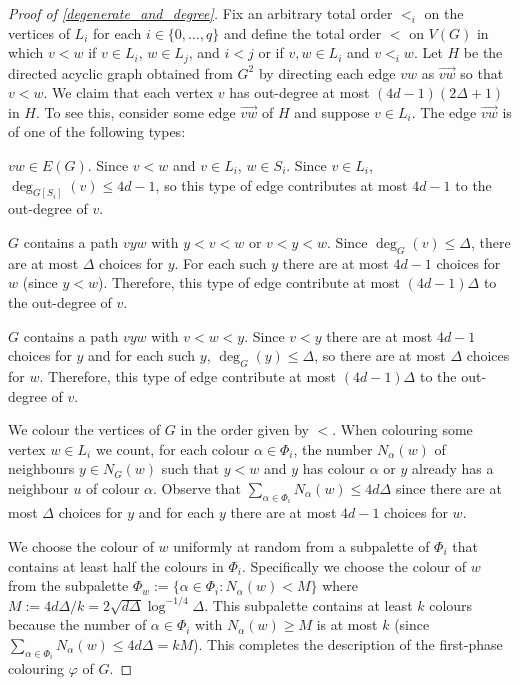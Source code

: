 \documentclass{patmorin}
\begin{document}
\begin{proof}[Proof of \cref{degenerate_and_degree}]
  Fix an arbitrary total order $<_i$ on the vertices of $L_i$ for each $i\in\{0,\ldots,q\}$ and define the total order $<$ on $V(G)$ in which $v <w$ if $v\in L_i$, $w\in L_j$, and $i<j$ or if $v,w\in L_i$ and $v<_iw$.  Let $H$ be the directed acyclic graph obtained from $G^2$ by directing each edge $vw$ as $\overrightarrow{vw}$ so that $v<w$.  We claim that each vertex $v$ has out-degree at most $(4d-1)(2\Delta+1)$ in $H$.  To see this, consider some edge $\overrightarrow{vw}$ of $H$ and suppose $v\in L_i$.  The edge  $\overrightarrow{vw}$ is of one of the following types:
  \begin{compactenum}[(T1)]
    \item $vw\in E(G)$.  Since $v<w$ and $v\in L_i$, $w\in S_i$.  Since $v\in L_i$, $\deg_{G[S_i]}(v)\le 4d-1$, so this type of edge contributes at most $4d-1$ to the out-degree of $v$.
    \item $G$ contains a path $vyw$ with $y < v < w$ or $v < y < w$.  Since $\deg_G(v)\le\Delta$, there are at most $\Delta$ choices for $y$.  For each such $y$ there are at most $4d-1$ choices for $w$ (since $y<w$).  Therefore, this type of edge contribute at most $(4d-1)\Delta$ to the out-degree of $v$.
    \item $G$ contains a path $vyw$ with $v < w < y$.  Since $v<y$ there are at most $4d-1$ choices for $y$ and for each such $y$, $\deg_G(y)\le\Delta$, so there are at most $\Delta$ choices for $w$.  Therefore, this type of edge contribute at most $(4d-1)\Delta$ to the out-degree of $v$.
  \end{compactenum}
  We colour the vertices of $G$ in the order given by $<$.  When colouring some vertex $w\in L_i$ we count, for each colour $\alpha\in \Phi_i$, the number $N_\alpha(w)$ of neighbours $y\in N_G(w)$ such that $y < w$ and $y$ has colour $\alpha$ or $y$ already has a neighbour $u$ of colour $\alpha$. Observe that $\sum_{\alpha\in \Phi_i} N_\alpha(w)\le 4d\Delta$ since there are at most $\Delta$ choices for $y$ and for each $y$ there are at most $4d-1$ choices for $w$.

  We choose the colour of $w$ uniformly at random from a subpalette of $\Phi_i$ that contains at least half the colours in $\Phi_i$.  Specifically we choose the colour of $w$ from the subpalette $\Phi_w:=\{\alpha\in\Phi_i: N_{\alpha}(w)<M\}$ where $M:=4d\Delta/k = 2\sqrt{d\Delta}\log^{-1/4}\Delta$.  This subpalette contains at least $k$ colours because the number of $\alpha\in\Phi_i$ with $N_\alpha(w)\ge M$ is at most $k$   (since $\sum_{\alpha\in\Phi_i} N_\alpha(w) \le 4d\Delta = kM$).
  This completes the description of the first-phase colouring $\varphi$ of $G$.


\end{proof}
\end{document}
